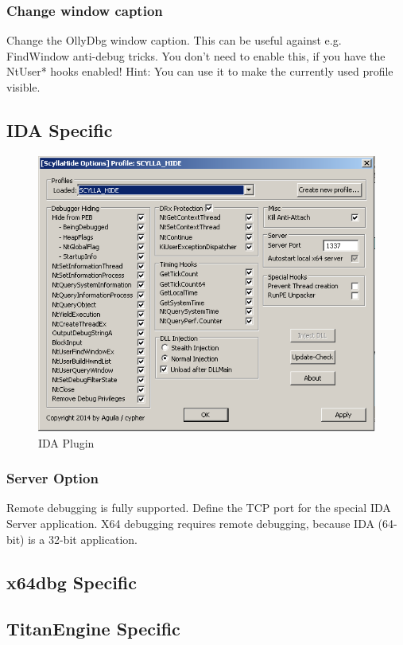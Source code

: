 \documentclass[10pt,a4paper]{article}
\begin{document}
\subsubsection{Change window caption}
Change the OllyDbg window caption. This can be useful against e.g. FindWindow anti-debug tricks. You don't need to enable this, if you have the NtUser* hooks enabled! Hint: You can use it to make the currently used profile visible.

\subsection{IDA Specific}

\begin{figure}[H]
\centering
\includegraphics[scale=1]{idaplugin.PNG}
\caption{IDA Plugin}
\end{figure}

\subsubsection{Server Option}
Remote debugging is fully supported. Define the TCP port for the special IDA Server application. X64 debugging requires remote debugging, because IDA (64-bit) is a 32-bit application.

\subsection{x64dbg Specific}
\subsection{TitanEngine Specific}
\end{document}
